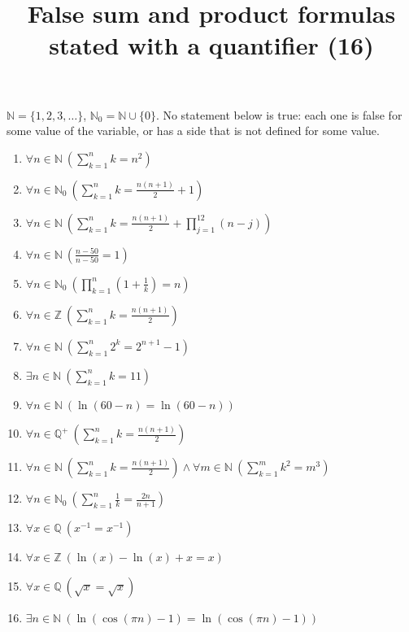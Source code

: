 \documentclass[11pt,a4paper]{article}
\title{False sum and product formulas stated with a quantifier (16)}
\author{}
\date{}
\begin{document}
\maketitle
$\mathbb{N} = \{1, 2, 3, \ldots\}$, $\mathbb{N}_{0} = \mathbb{N} \cup \{0\}$. No statement below is true: each one is false for some value of the variable, or has a side that is not defined for some value.

\begin{enumerate}
\item $\displaystyle \forall n \in \mathbb{N}\ \left(\sum_{k=1}^{n} k = n^{2}\right)$
\item $\displaystyle \forall n \in \mathbb{N}_{0}\ \left(\sum_{k=1}^{n} k = \frac{n\left(n + 1\right)}{2} + 1\right)$
\item $\displaystyle \forall n \in \mathbb{N}\ \left(\sum_{k=1}^{n} k = \frac{n\left(n + 1\right)}{2} + \prod_{j=1}^{12} \left(n - j\right)\right)$
\item $\displaystyle \forall n \in \mathbb{N}\ \left(\frac{n - 50}{n - 50} = 1\right)$
\item $\displaystyle \forall n \in \mathbb{N}_{0}\ \left(\prod_{k=1}^{n} \left(1 + \frac{1}{k}\right) = n\right)$
\item $\displaystyle \forall n \in \mathbb{Z}\ \left(\sum_{k=1}^{n} k = \frac{n\left(n + 1\right)}{2}\right)$
\item $\displaystyle \forall n \in \mathbb{N}\ \left(\sum_{k=1}^{n} 2^{k} = 2^{n + 1} - 1\right)$
\item $\displaystyle \exists n \in \mathbb{N}\ \left(\sum_{k=1}^{n} k = 11\right)$
\item $\displaystyle \forall n \in \mathbb{N}\ \left(\ln\left(60 - n\right) = \ln\left(60 - n\right)\right)$
\item $\displaystyle \forall n \in \mathbb{Q}^{+}\ \left(\sum_{k=1}^{n} k = \frac{n\left(n + 1\right)}{2}\right)$
\item $\displaystyle \forall n \in \mathbb{N}\ \left(\sum_{k=1}^{n} k = \frac{n\left(n + 1\right)}{2}\right) \land \forall m \in \mathbb{N}\ \left(\sum_{k=1}^{m} k^{2} = m^{3}\right)$
\item $\displaystyle \forall n \in \mathbb{N}_{0}\ \left(\sum_{k=1}^{n} \frac{1}{k} = \frac{2n}{n + 1}\right)$
\item $\displaystyle \forall x \in \mathbb{Q}\ (x^{-1} = x^{-1})$
\item $\displaystyle \forall x \in \mathbb{Z}\ (\ln\left(x\right) - \ln\left(x\right) + x = x)$
\item $\displaystyle \forall x \in \mathbb{Q}\ \left(\sqrt{x} = \sqrt{x}\right)$
\item $\displaystyle \exists n \in \mathbb{N}\ \left(\ln\left(\cos\left(\pi n\right) - 1\right) = \ln\left(\cos\left(\pi n\right) - 1\right)\right)$
\end{enumerate}
\end{document}
